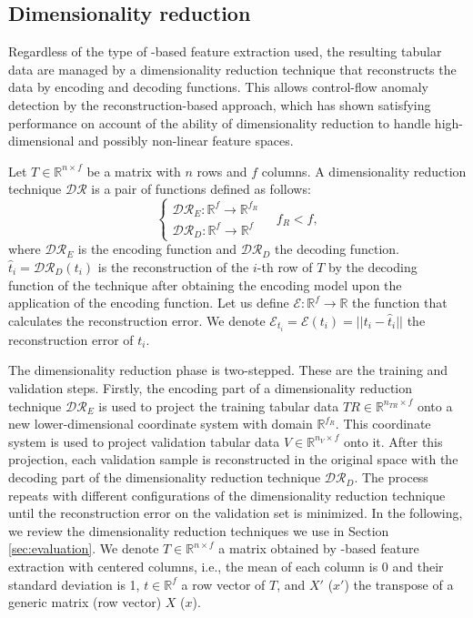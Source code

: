 \subsection{Dimensionality reduction}
Regardless of the type of -based feature extraction used, the resulting tabular data are managed by a dimensionality reduction technique that reconstructs the data by encoding and decoding functions. This allows control-flow anomaly detection by the reconstruction-based approach, which has shown satisfying performance on account of the ability of dimensionality reduction to handle high-dimensional and possibly non-linear feature spaces.
\begin{definition}
Let $T\in\mathbb{R}^{n\times f}$ be a matrix with $n$ rows and $f$ columns. A dimensionality reduction technique $\mathcal{DR}$ is a pair of functions defined as follows:
\begin{equation}
\begin{cases}
\mathcal{DR}_E:\mathbb{R}^{f}\rightarrow\mathbb{R}^{f_R}\\
\mathcal{DR}_D:\mathbb{R}^{f}\rightarrow\mathbb{R}^{f}
\end{cases}\quad f_R<f,
\end{equation}
where $\mathcal{DR}_E$ is the encoding function and $\mathcal{DR}_D$ the decoding function. $\hat{t}_i=\mathcal{DR}_D(t_i)$ is the reconstruction of the $i$-th row of $T$ by the decoding function of the technique after obtaining the encoding model upon the application of the encoding function. Let us define $\mathcal{E}:\mathbb{R}^f\rightarrow \mathbb{R}$ the function that calculates the reconstruction error. We denote $\mathcal{E}_{t_i}=\mathcal{E}(t_i)= ||t_i-\hat{t}_i||$ the reconstruction error of $t_i$.
\end{definition}

The dimensionality reduction phase is two-stepped. These are the training and validation steps. Firstly, the encoding part of a dimensionality reduction technique $\mathcal{DR}_E$ is used to project the training tabular data $TR\in\mathbb{R}^{n_{TR}\times f}$ onto a new lower-dimensional coordinate system with domain $\mathbb{R}^{f_R}$. This coordinate system is used to project validation tabular data $V\in\mathbb{R}^{n_V\times f}$ onto it. After this projection, each validation sample is reconstructed in the original space with the decoding part of the dimensionality reduction technique $\mathcal{DR}_D$. The process repeats with different configurations of the dimensionality reduction technique until the reconstruction error on the validation set is minimized. In the following, we review the dimensionality reduction techniques we use in Section \ref{sec:evaluation}. We denote $T\in\mathbb{R}^{n\times f}$ a matrix obtained by -based feature extraction with centered columns, i.e., the mean of each column is 0 and their standard deviation is 1, $t\in \mathbb{R}^f$ a row vector of $T$, and $X'$ ($x'$) the transpose of a generic matrix (row vector) $X$ ($x$).

